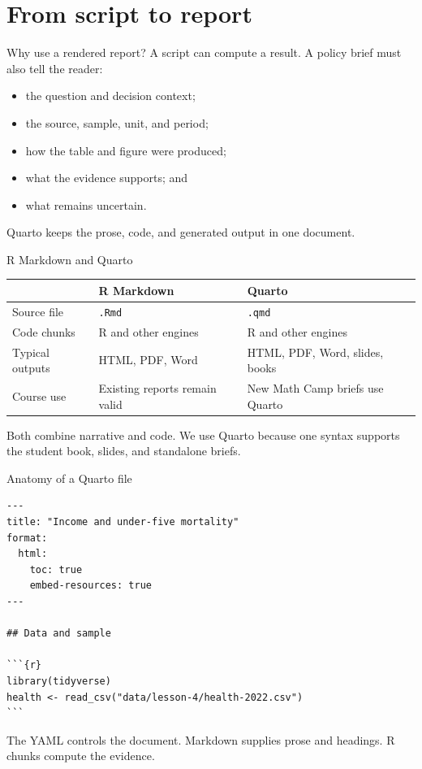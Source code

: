 \section{From script to report}

\begin{frame}{Why use a rendered report?}
A script can compute a result. A policy brief must also tell the reader:
\begin{itemize}
\item the question and decision context;
\item the source, sample, unit, and period;
\item how the table and figure were produced;
\item what the evidence supports; and
\item what remains uncertain.
\end{itemize}
\vspace{0.3cm}
Quarto keeps the prose, code, and generated output in one document.
\end{frame}

\begin{frame}{R Markdown and Quarto}
\small
\begin{tabularx}{\textwidth}{p{2.6cm} X X}
\toprule
 & R Markdown & Quarto \\
\midrule
Source file & \texttt{.Rmd} & \texttt{.qmd} \\
Code chunks & R and other engines & R and other engines \\
Typical outputs & HTML, PDF, Word & HTML, PDF, Word, slides, books \\
Course use & Existing reports remain valid & New Math Camp briefs use Quarto \\
\bottomrule
\end{tabularx}
\vspace{0.35cm}
Both combine narrative and code. We use Quarto because one syntax supports the student book, slides, and standalone briefs.
\end{frame}

\begin{frame}[fragile]{Anatomy of a Quarto file}
\begin{lstlisting}
---
title: "Income and under-five mortality"
format:
  html:
    toc: true
    embed-resources: true
---

## Data and sample

```{r}
library(tidyverse)
health <- read_csv("data/lesson-4/health-2022.csv")
```
\end{lstlisting}
The YAML controls the document. Markdown supplies prose and headings. R chunks compute the evidence.
\end{frame}


